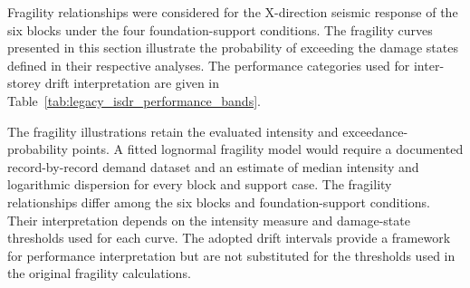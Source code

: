 Fragility relationships were considered for the X-direction seismic response of the six blocks under the four foundation-support conditions. The fragility curves presented in this section illustrate the probability of exceeding the damage states defined in their respective analyses. The performance categories used for inter-storey drift interpretation are given in Table~\ref{tab:legacy_isdr_performance_bands}.

The fragility illustrations retain the evaluated intensity and exceedance-probability points. A fitted lognormal fragility model would require a documented record-by-record demand dataset and an estimate of median intensity and logarithmic dispersion for every block and support case. The fragility relationships differ among the six blocks and foundation-support conditions. Their interpretation depends on the intensity measure and damage-state thresholds used for each curve. The adopted drift intervals provide a framework for performance interpretation but are not substituted for the thresholds used in the original fragility calculations.

